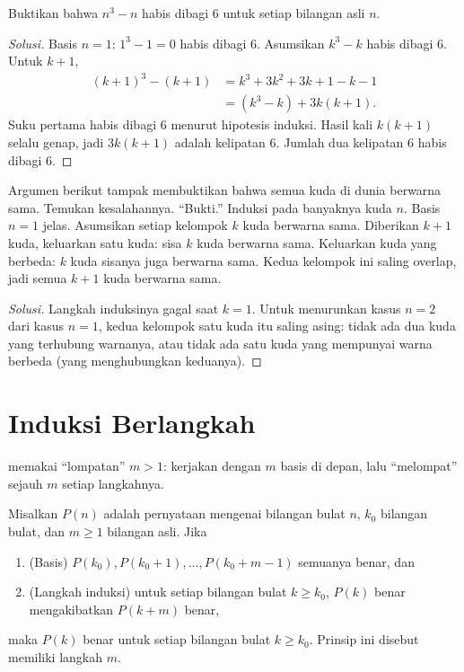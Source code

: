 \documentclass[12pt]{scrartcl}
\begin{document}
\begin{example}
Buktikan bahwa $n^3 - n$ habis dibagi $6$ untuk setiap bilangan asli $n$.
\end{example}
\begin{proof}[Solusi]
Basis $n = 1$: $1^3 - 1 = 0$ habis dibagi $6$.
Asumsikan $k^3 - k$ habis dibagi $6$. Untuk $k+1$,
\begin{align*}
(k+1)^3 - (k+1) &= k^3 + 3k^2 + 3k + 1 - k - 1 \\
&= (k^3 - k) + 3k(k+1).
\end{align*}
Suku pertama habis dibagi $6$ menurut hipotesis induksi.
Hasil kali $k(k+1)$ selalu genap, jadi $3k(k+1)$ adalah kelipatan $6$.
Jumlah dua kelipatan $6$ habis dibagi $6$.
\end{proof}

\begin{example}
Argumen berikut tampak membuktikan bahwa semua kuda di dunia berwarna sama.
Temukan kesalahannya. ``Bukti.'' Induksi pada banyaknya kuda $n$.
Basis $n = 1$ jelas.
Asumsikan setiap kelompok $k$ kuda berwarna sama.
Diberikan $k+1$ kuda, keluarkan satu kuda: sisa $k$ kuda berwarna sama.
Keluarkan kuda yang berbeda: $k$ kuda sisanya juga berwarna sama.
Kedua kelompok ini saling overlap, jadi semua $k+1$ kuda berwarna sama.
\end{example}
\begin{proof}[Solusi]
Langkah induksinya gagal saat $k = 1$.
Untuk menurunkan kasus $n = 2$ dari kasus $n = 1$,
kedua kelompok satu kuda itu saling asing: tidak ada dua kuda
yang terhubung warnanya, atau tidak ada satu kuda yang mempunyai warna berbeda (yang menghubungkan keduanya).
\end{proof}

\section{Induksi Berlangkah}
 memakai ``lompatan'' $m > 1$:
kerjakan dengan $m$ basis di depan, lalu ``melompat'' sejauh $m$ setiap langkahnya.

\begin{theorem}
Misalkan $P(n)$ adalah pernyataan mengenai bilangan bulat $n$,
$k_0$ bilangan bulat, dan $m \ge 1$ bilangan asli. Jika
\begin{enumerate}
    \item (Basis) $P(k_0), P(k_0 + 1), \dots, P(k_0 + m - 1)$ semuanya benar, dan
    \item (Langkah induksi) untuk setiap bilangan bulat $k \ge k_0$,
    $P(k)$ benar mengakibatkan $P(k+m)$ benar,
\end{enumerate}
maka $P(k)$ benar untuk setiap bilangan bulat $k \ge k_0$.
Prinsip ini disebut memiliki langkah $m$.
\end{theorem}
\end{document}
